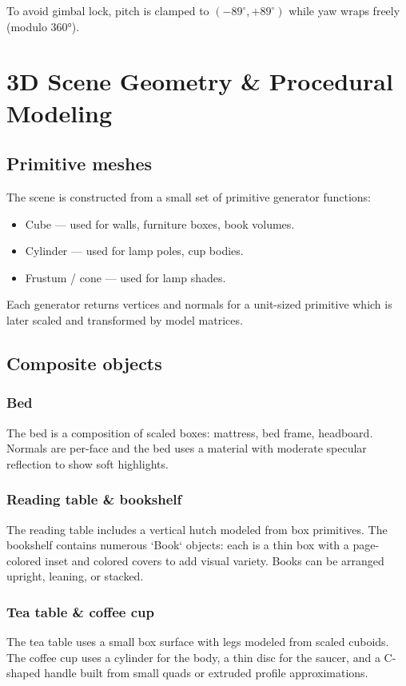 \documentclass[12pt,a4paper]{report}
\begin{document}
To avoid gimbal lock, pitch is clamped to \( (-89^\circ, +89^\circ) \) while yaw wraps freely (modulo 360°).

\chapter{3D Scene Geometry \& Procedural Modeling}

\section{Primitive meshes}
The scene is constructed from a small set of primitive generator functions:
\begin{itemize}
  \item Cube — used for walls, furniture boxes, book volumes.
  \item Cylinder — used for lamp poles, cup bodies.
  \item Frustum / cone — used for lamp shades.
\end{itemize}
Each generator returns vertices and normals for a unit-sized primitive which is later scaled and transformed by model matrices.

\section{Composite objects}
\subsection{Bed}
The bed is a composition of scaled boxes: mattress, bed frame, headboard. Normals are per-face and the bed uses a material with moderate specular reflection to show soft highlights.

\subsection{Reading table \& bookshelf}
The reading table includes a vertical hutch modeled from box primitives. The bookshelf contains numerous `Book` objects: each is a thin box with a page-colored inset and colored covers to add visual variety. Books can be arranged upright, leaning, or stacked.

\subsection{Tea table \& coffee cup}
The tea table uses a small box surface with legs modeled from scaled cuboids. The coffee cup uses a cylinder for the body, a thin disc for the saucer, and a C-shaped handle built from small quads or extruded profile approximations.
\end{document}
